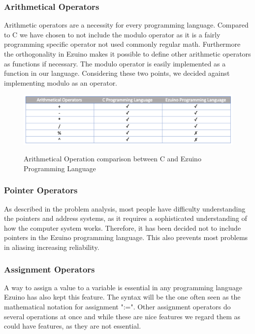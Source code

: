 \subsubsection*{Arithmetical Operators}
Arithmetic operators are a necessity for every programming language. 
Compared to C we have chosen to not include the modulo operator as it is a fairly programming specific operator not used commonly regular math. Furthermore the orthogonality in Ezuino makes it possible to define other arithmetic operators as functions if necessary. The modulo operator is easily implemented as a function in our language. Considering these two points, we decided against implementing modulo as an operator.
\begin{figure}[H]
\centering
\caption{Arithmetical Operation comparison between C and Ezuino Programming Language}
\includegraphics[scale=0.60]{figures/language_features/langf05.png}
\label{lf05}
\end{figure}

\subsubsection*{Pointer Operators}
As described in the problem analysis, most people have difficulty understanding the pointers and address systems, as it requires a sophisticated understanding of how the computer system works. Therefore, it has been decided not to include pointers in the Ezuino programming language. This also prevents most problems in aliasing increasing reliability.
\subsubsection*{Assignment Operators}
A way to assign a value to a variable is essential in any programming language Ezuino has also kept this feature. The syntax will be the one often seen as the mathematical notation for assignment ":=". Other assignment operators do several operations at once and while these are nice features we regard them as could have features, as they are not essential.
